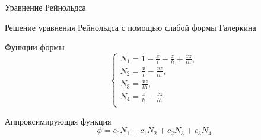 \documentclass[ignoreonframetext,unicode]{beamer}
\begin{document}
\begin{frame}{Уравнение Рейнольдса}
	\end{frame}	

\begin{frame}{Решение уравнения Рейнольдса с помощью слабой формы Галеркина}
		



	\begin{block}{Функции формы}
		\[
			\begin{cases}
				N_1 = 1 - \frac{x}{l} - \frac{z}{h} + \frac{x  z}{l  h}, \\
				N_2 = \frac{x}{l} - \frac{x  z}{l  h}, \\
				N_3 = \frac{x  z}{l h}, \\
				N_4 = \frac{z}{h} - \frac{x  z}{l  h} \\
			\end{cases}
			\label{form-func}
		\]
	\end{block}


\begin{block}{Аппроксимирующая функция}
	\[
	\phi = c_0 N_1 + c_1 N_2 + c_2 N_3 + c_3 N_4
	\]
\end{block}
	
\end{frame}
\end{document}
